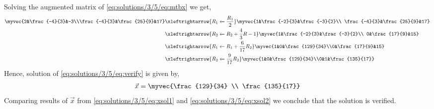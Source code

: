 Solving the augmented matrix of \eqref{eq:solutions/3/5/eq:mtbx} we get, 
\begin{align}
    \myvec{2&\frac{-4}{3}&-3\\\frac{-4}{3}&\frac{25}{9}&17}&\xleftrightarrow{R_1\xleftarrow{}\frac{R_1}{2}} \myvec{1&\frac{-2}{3}&\frac{-3}{2}\\ \frac{-4}{3}&\frac{25}{9}&17} \\
    &\xleftrightarrow{R_2\xleftarrow{}R_2+\frac{4}{3}R-1} \myvec{1&\frac{-2}{3}&\frac{-3}{2}\\ 0&\frac{17}{9}&15}\\
    &\xleftrightarrow{R_1\xleftarrow{}R_1+\frac{6}{17}R_2} \myvec{1&0&\frac{129}{34}\\0&\frac{17}{9}&15}\\
    &\xleftrightarrow{R_2\xleftarrow{}\frac{9}{17}R_2} \myvec{1&0&\frac{129}{34}\\0&1&\frac{135}{17}}
\end{align}
Hence, solution of \eqref{eq:solutions/3/5/eq:verify} is given by, 
\begin{align}\label{eq:solutions/3/5/eq:xsol2}
    \vec{x}=\myvec{\frac{129}{34} \\ \frac{135}{17}}
\end{align}
Comparing results of $\vec{x}$ from \eqref{eq:solutions/3/5/eq:xsol1} and \eqref{eq:solutions/3/5/eq:xsol2} we conclude that the solution is verified. 
